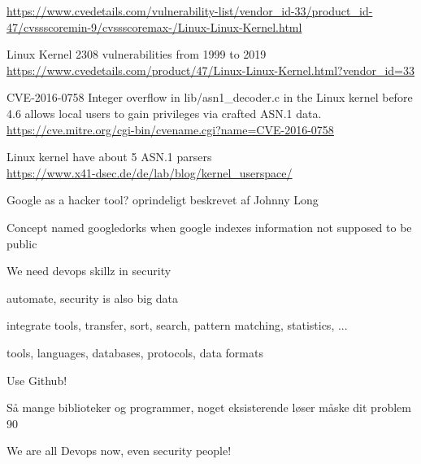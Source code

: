 \documentclass[Screen16to9,17pt]{foils}
\begin{document}
{\footnotesize\url{https://www.cvedetails.com/vulnerability-list/vendor_id-33/product_id-47/cvssscoremin-9/cvssscoremax-/Linux-Linux-Kernel.html}}

Linux Kernel 2308 vulnerabilities from 1999 to 2019\\
\url{https://www.cvedetails.com/product/47/Linux-Linux-Kernel.html?vendor_id=33}


\begin{list2}
\item CVE-2016-0758 Integer overflow in lib/asn1\_decoder.c in the Linux kernel before 4.6 allows local users to gain privileges via crafted ASN.1 data.\\
\url{https://cve.mitre.org/cgi-bin/cvename.cgi?name=CVE-2016-0758}
\item Linux kernel have about 5 ASN.1 parsers\\
\url{https://www.x41-dsec.de/de/lab/blog/kernel_userspace/}
\end{list2}




\begin{list2}
\item Google as a hacker tool? oprindeligt beskrevet af Johnny Long
\item Concept named googledorks when google indexes information not supposed to be public
\item {}
\end{list2}




\begin{list1}
\item We need devops skillz in security
\item automate, security is also big data
\item integrate tools, transfer, sort, search, pattern matching, statistics, ...
\item tools, languages, databases, protocols, data formats
\item Use Github!
\item Så mange biblioteker og programmer, noget eksisterende løser måske dit problem 90%
\end{list1}

\vskip 1cm
\centerline{\Large We are all Devops now, even security people!}
\end{document}

